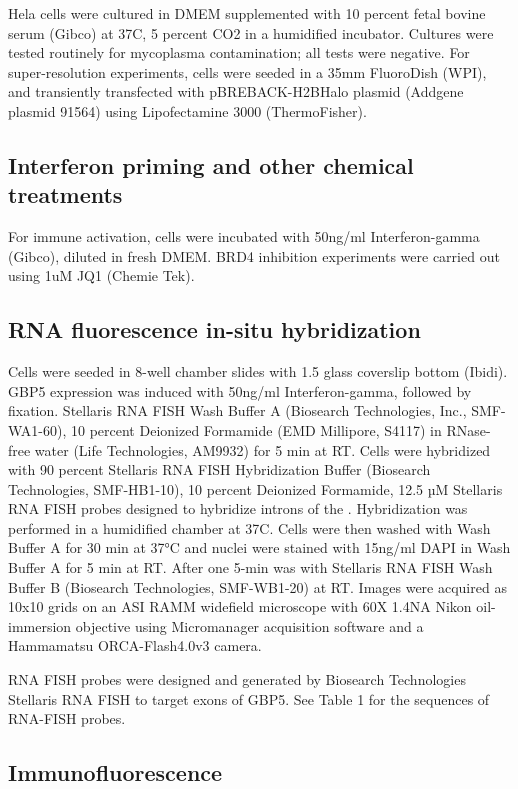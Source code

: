\documentclass{ucetd}
\begin{document}
Hela cells were cultured in DMEM supplemented with 10  percent  fetal bovine serum (Gibco) at 37C, 5  percent  CO2 in a humidified incubator. Cultures were tested routinely for mycoplasma contamination; all tests were negative. For super-resolution experiments, cells were seeded in a 35mm FluoroDish (WPI), and transiently transfected with pBREBACK-H2BHalo plasmid (Addgene plasmid 91564) using Lipofectamine 3000 (ThermoFisher). 

\subsection{Interferon priming and other chemical treatments}

For immune activation, cells were incubated with 50ng/ml Interferon-gamma (Gibco), diluted in fresh DMEM. BRD4 inhibition experiments were carried out using 1uM JQ1 (Chemie Tek).  

\subsection{RNA fluorescence in-situ hybridization}

Cells were seeded in 8-well chamber slides with 1.5 glass coverslip bottom (Ibidi). GBP5 expression was induced with 50ng/ml Interferon-gamma, followed by fixation. Stellaris RNA FISH Wash Buffer A (Biosearch Technologies, Inc., SMF-WA1-60), 10  percent  Deionized Formamide (EMD Millipore, S4117) in RNase-free water (Life Technologies, AM9932) for 5 min at RT. Cells were hybridized with 90  percent  Stellaris RNA FISH Hybridization Buffer (Biosearch Technologies, SMF-HB1-10), 10  percent  Deionized Formamide, 12.5 µM Stellaris RNA FISH probes designed to hybridize introns of the . Hybridization was performed in a humidified chamber at 37C. Cells were then washed with Wash Buffer A for 30 min at 37°C and nuclei were stained with 15ng/ml DAPI in Wash Buffer A for 5 min at RT. After one 5-min was with Stellaris RNA FISH Wash Buffer B (Biosearch Technologies, SMF-WB1-20) at RT. Images were acquired as 10x10 grids on an ASI RAMM widefield microscope with 60X 1.4NA Nikon oil-immersion objective using Micromanager acquisition software and a Hammamatsu ORCA-Flash4.0v3 camera.  

RNA FISH probes were designed and generated by Biosearch Technologies Stellaris RNA FISH to target exons of GBP5. See Table 1 for the sequences of RNA-FISH probes.  

\subsection{Immunofluorescence}
\end{document}
